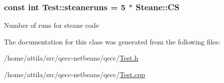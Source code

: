 \subsubsection[{\texorpdfstring{steaneruns}{steaneruns}}]{\setlength{\rightskip}{0pt plus 5cm}const int Test\+::steaneruns = 5 $\ast$ {\bf Steane\+::\+CS}\hspace{0.3cm}{\ttfamily [static]}}\hypertarget{class_test_a1f5e5c6be1ad2c4459ad702c254c72a1}{}\label{class_test_a1f5e5c6be1ad2c4459ad702c254c72a1}
Number of runs for steane code 

The documentation for this class was generated from the following files\+:\begin{DoxyCompactItemize}
\item 
/home/attila/src/qecc-\/netbeans/qecc/\hyperlink{_test_8h}{Test.\+h}\item 
/home/attila/src/qecc-\/netbeans/qecc/\hyperlink{_test_8cpp}{Test.\+cpp}\end{DoxyCompactItemize}
